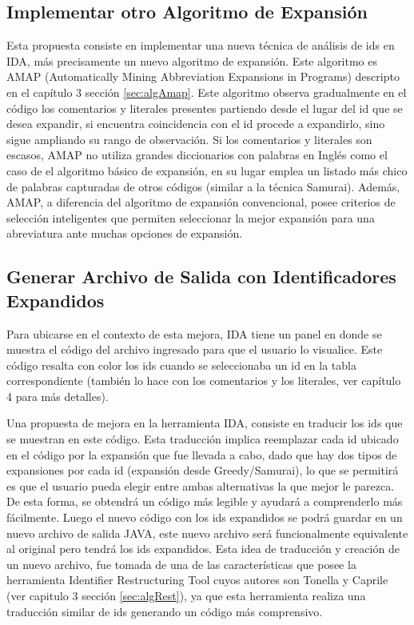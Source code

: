  
\subsection{Implementar otro Algoritmo de Expansión}

Esta propuesta consiste en implementar una nueva técnica de análisis de ids en IDA, más precisamente un nuevo algoritmo de expansión. Este algoritmo es AMAP (Automatically Mining Abbreviation Expansions in Programs) descripto en el capítulo 3 sección \ref{sec:algAmap}. Este algoritmo observa gradualmente en el código los comentarios y literales presentes partiendo desde el lugar del id que se desea expandir, si encuentra coincidencia con el id procede a expandirlo, sino sigue ampliando su rango de observación. Si los comentarios y literales son escasos, AMAP no utiliza grandes diccionarios con palabras en Inglés como el caso de el algoritmo básico de expansión, en su lugar emplea un listado más chico de palabras capturadas de otros códigos (similar a la técnica Samurai).
Además, AMAP, a diferencia del algoritmo de expansión convencional, posee criterios de selección inteligentes que permiten seleccionar la mejor expansión para una abreviatura ante muchas opciones de expansión.

\subsection{Generar Archivo de Salida con Identificadores Expandidos}

Para ubicarse en el contexto de esta mejora, IDA tiene un panel en donde se muestra el código del archivo ingresado para que el usuario lo visualice. Este código resalta con color los ids cuando se seleccionaba un id en la tabla correspondiente (también lo hace con los comentarios y los literales, ver capítulo 4 para más detalles).

Una propuesta de mejora en la herramienta IDA, consiste en traducir los ids que se muestran en este código.
Esta traducción implica reemplazar cada id ubicado en el código por la expansión que fue llevada a cabo, dado que hay dos tipos de expansiones por cada id (expansión desde Greedy/Samurai), lo que se permitirá es que el usuario pueda elegir entre ambas alternativas la que mejor le parezca. De esta forma, se obtendrá un código más legible y ayudará a comprenderlo más fácilmente. Luego el nuevo código con los ids expandidos se podrá guardar en un nuevo archivo de salida JAVA, este nuevo archivo será funcionalmente equivalente al original pero tendrá los ids expandidos. Esta idea de traducción y creación de un nuevo archivo, fue tomada de una de las características que posee la herramienta Identifier Restructuring Tool cuyos autores son Tonella y Caprile (ver capitulo 3 sección \ref{sec:algRest}), ya que esta herramienta realiza una traducción similar de ids generando un código más comprensivo.

